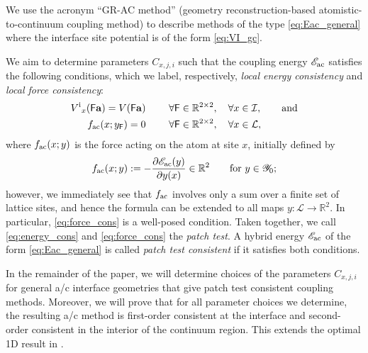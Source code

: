 \documentclass[12pt, reqno, a4paper]{amsart}
\numberwithin{equation}{section}
\numberwithin{theorem}{section}
\numberwithin{remark}{section}
\begin{document}
We use the acronym ``GR-AC method'' (geometry reconstruction-based
atomistic-to-continuum coupling method) to describe methods of the
type \eqref{eq:Eac_general} where the interface site potential is of
the form \eqref{eq:VI_gc}.

We aim to determine parameters $C_{x,j,i}$ such that the coupling
energy ${{\mathscr{E}}_{{\rm ac}}}$ satisfies the following conditions, which we label,
respectively, {\it local energy consistency} and {\it local force
  consistency}:
\begin{align}
  \label{eq:energy_cons}
  {V^{{\rm i}}}_x( {{\sf F}} {\bf a} ) = V( {{\sf F}} {\bf a} )~& \qquad \forall {{\sf F}} \in
  {\mathbb{R}}^{2 \times 2}, \quad \forall x \in {\mathcal{I}}, \qquad \text{and} \\
    \label{eq:force_cons}
  f_{{\rm ac}}( x; {y_{{\sf F}}} ) = 0 ~& \qquad \forall {{\sf F}} \in {\mathbb{R}}^{2 \times 2},
  \quad \forall x \in {\mathcal{L}},
\end{align}
where $f_{{\rm ac}}(x;y)$ is the force acting on the atom at site $x$,
initially defined by
\begin{displaymath}
  f_{{\rm ac}}(x; y) := - \frac{{\partial} {{\mathscr{E}}_{{\rm ac}}}(y)}{{\partial} y(x)} \in {\mathbb{R}}^2 \qquad
  \text{for } y \in {\mathscr{Y}}_0;
\end{displaymath}
however, we immediately see that $f_{{\rm ac}}$ involves only a sum over a
finite set of lattice sites, and hence the formula can be extended to
all maps $y : {\mathcal{L}} \to {\mathbb{R}}^2$. In particular, \eqref{eq:force_cons} is a
well-posed condition. Taken together, we call \eqref{eq:energy_cons}
and \eqref{eq:force_cons} the {\em patch test}. A hybrid energy ${{\mathscr{E}}_{{\rm ac}}}$
of the form \eqref{eq:Eac_general} is called {\em patch test consistent}
if it satisfies both conditions.

In the remainder of the paper, we will determine choices of the
parameters $C_{x,j,i}$ for general a/c interface geometries that give
patch test consistent coupling methods. Moreover, we will prove that
for all parameter choices we determine, the resulting a/c method is
first-order consistent at the interface and second-order consistent in
the interior of the continuum region. This extends the optimal 1D
result in \cite{Ortner:qnl.1d}.
\end{document}

